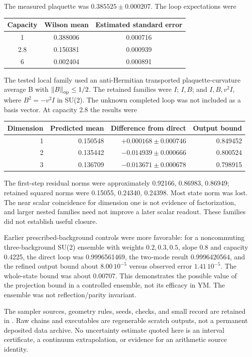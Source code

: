 The measured plaquette was $0.385525\pm0.000207$.
The loop expectations were
\begin{center}
\begin{tabular}{ccc}
\toprule
Capacity & Wilson mean & Estimated standard error\\
\midrule
1 & 0.388006 & 0.000716\\
2.8 & 0.150381 & 0.000939\\
6 & 0.002404 & 0.000891\\
\bottomrule
\end{tabular}
\end{center}
The tested local family used an anti-Hermitian transported
plaquette-curvature average B with $\left\lVert B\right\rVert_{\rm op}\le1/2$.
The retained families were $I$; $I,B$; and $I,B,v^2I$,
where $B^2=-v^2I$ in SU(2). The unknown completed loop
was not included as a basis vector.
At capacity 2.8 the results were
\begin{center}
\begin{tabular}{rrrr}
\toprule
Dimension & Predicted mean & Difference from direct & Output bound\\
\midrule
1 & 0.150548 & $+0.000168\pm0.000746$ & 0.849452\\
2 & 0.135442 & $-0.014939\pm0.000666$ & 0.800524\\
3 & 0.136709 & $-0.013671\pm0.000678$ & 0.798915\\
\bottomrule
\end{tabular}
\end{center}
The first-step residual norms were approximately
0.92166, 0.86983, 0.86949; retained squared norms were
0.15055, 0.24340, 0.24398. Most state norm was lost.
The near scalar coincidence for dimension one is not
evidence of factorization, and larger nested families
need not improve a later scalar readout. These families
did not establish useful closure.

Earlier prescribed-background controls were more favorable:
for a noncommuting three-background SU(2) ensemble with
weights $0.2,0.3,0.5$, slope 0.8 and capacity 0.4225,
the direct loop was 0.9996561469, the two-mode result
0.9996420564, and the refined output bound about
$8.00\,10^{-5}$ versus observed error $1.41\,10^{-5}$.
The whole-state bound was about 0.00707.
This demonstrates the possible value of the projection
bound in a controlled ensemble, not its efficacy in YM.
The ensemble was not reflection/parity invariant.

The sampler sources, geometry rules, seeds, checks, and
small record are retained in .
Raw chains and executables are regenerable scratch
outputs, not a permanent deposited data archive.
No uncertainty estimate quoted here is an interval
certificate, a continuum extrapolation, or evidence
for an arithmetic source identity.
